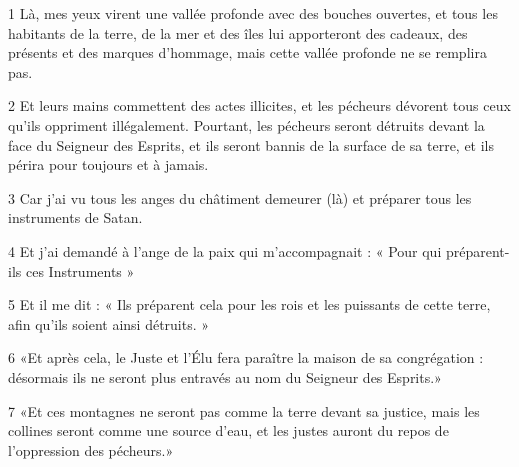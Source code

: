 \par 1 Là, mes yeux virent une vallée profonde avec des bouches ouvertes, et tous les habitants de la terre, de la mer et des îles lui apporteront des cadeaux, des présents et des marques d'hommage, mais cette vallée profonde ne se remplira pas.
\par 2 Et leurs mains commettent des actes illicites, et les pécheurs dévorent tous ceux qu'ils oppriment illégalement. Pourtant, les pécheurs seront détruits devant la face du Seigneur des Esprits, et ils seront bannis de la surface de sa terre, et ils périra pour toujours et à jamais.
\par 3 Car j'ai vu tous les anges du châtiment demeurer (là) et préparer tous les instruments de Satan.
\par 4 Et j'ai demandé à l'ange de la paix qui m'accompagnait : « Pour qui préparent-ils ces Instruments »
\par 5 Et il me dit : « Ils préparent cela pour les rois et les puissants de cette terre, afin qu'ils soient ainsi détruits. »
\par 6 «Et après cela, le Juste et l'Élu fera paraître la maison de sa congrégation : désormais ils ne seront plus entravés au nom du Seigneur des Esprits.»
\par 7 «Et ces montagnes ne seront pas comme la terre devant sa justice, mais les collines seront comme une source d'eau, et les justes auront du repos de l'oppression des pécheurs.»


